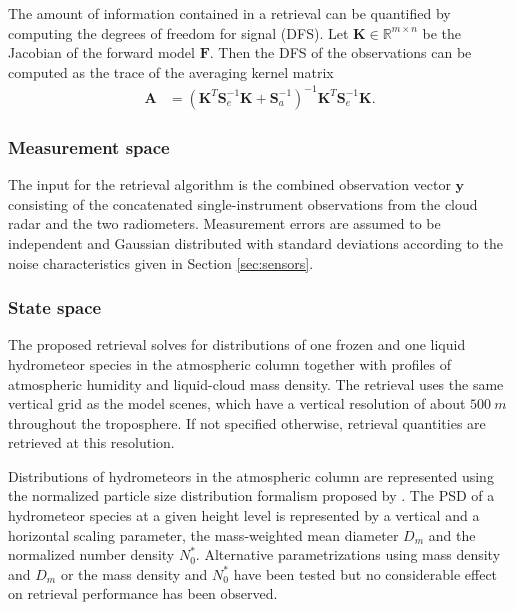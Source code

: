 \documentclass[journal abbreviation, manuscript]{copernicus}
\begin{document}
The amount of information contained in a retrieval can be quantified by
computing the degrees of freedom for signal (DFS). Let $\mathbf{K} \in
\mathbb{R}^{m \times n}$ be the Jacobian of the forward model $\mathbf{F}$. Then
the DFS of the observations can be computed as the trace of the averaging kernel
matrix
\begin{align}
  \mathbf{A} &=(\mathbf{K}^T\mathbf{S}_e^{-1}\mathbf{K} + \mathbf{S}_a^{-1})^{-1}
  \mathbf{K}^T\mathbf{S}_e^{-1}\mathbf{K}.
\end{align}

\subsubsection{Measurement space}
\label{sec:orge7dc286}

The input for the retrieval algorithm is the combined observation vector
$\mathbf{y}$ consisting of the concatenated single-instrument observations from
the cloud radar and the two radiometers. Measurement errors are assumed to be
independent and Gaussian distributed with standard deviations according to the
noise characteristics given in Section \ref{sec:sensors}.

\subsubsection{State space}
\label{sec:method:fowardmodel}

The proposed retrieval solves for distributions of one frozen and one liquid
hydrometeor species in the atmospheric column together with profiles of
atmospheric humidity and liquid-cloud mass density. The retrieval uses the same
vertical grid as the model scenes, which have a vertical resolution of about
$500\ \unit{m}$ throughout the troposphere. If not specified otherwise,
retrieval quantities are retrieved at this resolution.

Distributions of hydrometeors in the atmospheric column are represented using
the normalized particle size distribution formalism proposed by
\cite{delanoe05}. The PSD of a hydrometeor species at a given height level is
represented by a vertical and a horizontal scaling parameter, the mass-weighted
mean diameter $D_m$ and the normalized number density $N_0^*$. Alternative 
parametrizations using mass density and $D_m$ or the mass density and $N_0^*$
have been tested but no considerable effect on retrieval performance has been
observed.
\end{document}
